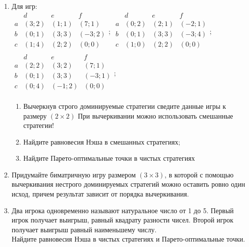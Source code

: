 \documentclass[pdftex,12pt,a4paper]{article}
\begin{document}
\begin{enumerate}
\item Для игр: \\
$\begin{array}{c|ccc}
    {} &  d & e & f   \\
\hline
    a &  (3;2) & (1;1) & (7;1)   \\
    b &  (0;1) & (3;3) & (-3;2)   \\
    c &  (1;4) & (2;2) & (0;0)   \\
\end{array}$;
 $\begin{array}{c|ccc}
    {} &  d & e & f   \\
\hline
    a &  (0;2) & (2;1) & (-2;1)   \\
    b &  (0;1) & (3;3) & (-3;4)   \\
    c &  (1;0) & (2;2) & (0;0)   \\
\end{array}$;
 $\begin{array}{c|ccc}
    {} &  d & e & f   \\
\hline
    a &  (2;2) & (3;2) & (7;1)   \\
    b &  (0;1) & (3;3) & (-3;1)   \\
    c &  (0;4) & (-1;2) & (0;0)   \\
\end{array}$;\\
\begin{enumerate}
\item Вычеркнув строго доминируемые стратегии сведите данные игры к размеру $(2\times 2)$ При вычеркивании можно использовать смешанные стратегии! 
\item Найдите равновесия Нэша в смешанных стратегиях;
\item Найдите Парето-оптимальные точки в чистых стратегиях 
\end{enumerate}

\item Придумайте биматричную игру размером $\left( {3 \times 3} \right)$, в которой с помощью вычеркивания нестрого доминируемых стратегий можно оставить ровно один исход, причем результат зависит от порядка вычеркивания.

\item Два игрока одновременно называют натуральное число от 1 до 5. Первый игрок получает выигрыш, равный квадрату разности чисел. Второй игрок получает выигрыш равный наименьшему числу. \\
Найдите равновесия Нэша в чистых стратегиях и Парето-оптимальные точки.


\end{enumerate}
\end{document}
